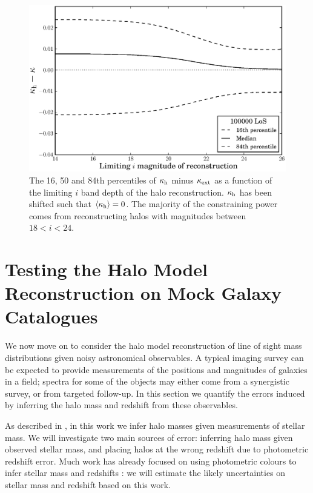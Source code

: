 \documentclass[useAMS,usenatbib]{mn2e}
\begin{document}
\begin{figure}
\includegraphics[width=\columnwidth]{figs/mag_scatter.eps}
\caption[magcut]{The 16, 50 and 84th percentiles of $\kappa_{\rm h}$ minus
$\kappa_{\rm ext}$ as a function of the limiting $i$ band depth of the halo
reconstruction. $\kappa_{\rm h}$ has been shifted such that
$\left\langle\kappa_{\rm h}\right\rangle=0$. The majority of the constraining power
comes from reconstructing halos with magnitudes between $18<i<24$.}
\label{fig:magcut}
\end{figure}



\section{Testing the Halo Model Reconstruction on Mock Galaxy Catalogues}
\label{sec:obsMstar+z}

We now move on to consider the halo model reconstruction of line of sight mass
distributions given noisy astronomical observables. A typical imaging survey
can be expected to provide measurements of the positions and magnitudes of
galaxies in a field;  spectra for some of the objects may either come from a
synergistic survey, or from targeted follow-up. In this section we quantify
the errors induced by inferring the halo mass and redshift from these
observables. 

As described in , in this work we infer halo masses
given measurements of stellar mass. We will investigate two main sources of
error: inferring halo mass given observed stellar mass, and placing halos at
the wrong redshift due to photometric redshift error. Much work has already
focused on using photometric colours to infer stellar mass
\citep[\eg][]{AugerEtal2009} and redshifts \citep[\eg][]{BPZ}: we will
estimate the likely uncertainties on stellar mass and redshift based on this
work.  
\end{document}
